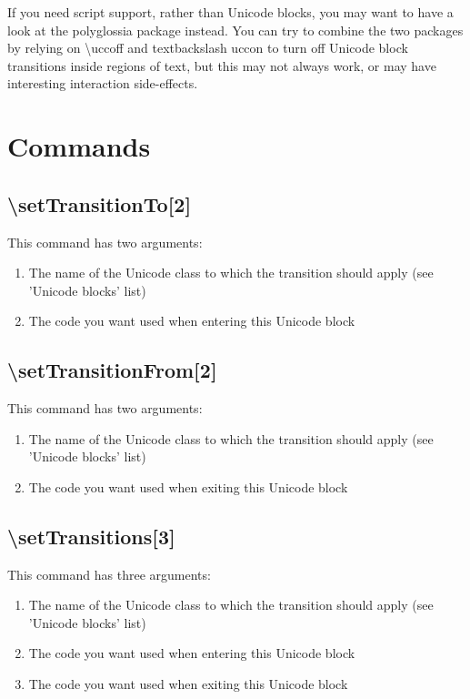 \documentclass{article}
\newenvironment{numberlist}{%
  \begin{enumerate}
  \setlength{\itemsep}{0pt}
  \setlength{\parsep}{0pt}
  \setlength{\topsep}{0pt}
  \setlength{\partopsep}{0pt}
  \setlength{\parskip}{0pt}
  \setlength{\labelsep}{5pt}}%
{
  \end{enumerate}}
\begin{document}
    If you need script support, rather than Unicode blocks, you may want to have a look at the polyglossia package instead. You can try to combine the two packages by relying on \textbackslash uccoff and textbackslash uccon to turn off Unicode block transitions inside regions of text, but this may not always work, or may have interesting interaction side-effects.

  \pagebreak

  \section{Commands}

    \subsection{\textbackslash setTransitionTo[2]}

      This command has two arguments:

      \begin{numberlist}
        \item The name of the Unicode class to which the transition should apply (see 'Unicode blocks' list)
        \item The code you want used when entering this Unicode block
      \end{numberlist}

    \subsection{\textbackslash setTransitionFrom[2]}

      This command has two arguments:

      \begin{numberlist}
        \item The name of the Unicode class to which the transition should apply (see 'Unicode blocks' list)
        \item The code you want used when exiting this Unicode block
      \end{numberlist}

    \subsection{\textbackslash setTransitions[3]}

      This command has three arguments:

      \begin{numberlist}
        \item The name of the Unicode class to which the transition should apply (see 'Unicode blocks' list)
        \item The code you want used when entering this Unicode block
        \item The code you want used when exiting this Unicode block
      \end{numberlist}
\end{document}

